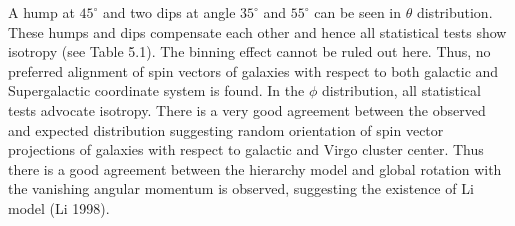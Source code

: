 \noindent A hump at $45^\circ$ and two dips at angle $35^\circ$ and $55^\circ$ can be seen in $\theta$ distribution. These humps and dips compensate each other and hence all statistical tests show isotropy (see Table 5.1). The binning effect cannot be ruled out here. Thus, no preferred alignment of spin vectors of galaxies with respect to both galactic and Supergalactic coordinate system is found. In the $\phi$ distribution, all statistical tests advocate isotropy. There is a very good agreement between the observed and expected distribution suggesting random orientation of spin vector projections of galaxies with respect to galactic and Virgo cluster center. Thus there is a good agreement between the hierarchy model and global rotation with the vanishing angular momentum is observed, suggesting the existence of Li model (Li 1998).

